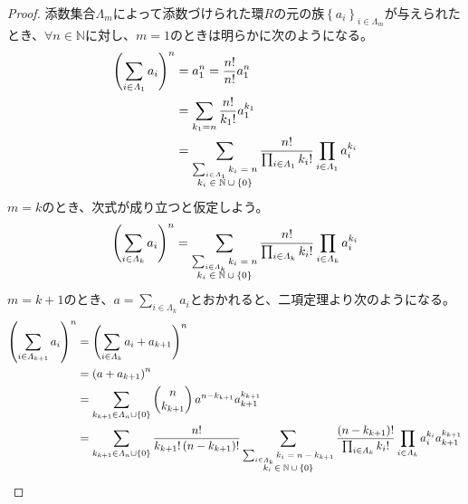 \documentclass[dvipdfmx]{jsarticle}
\begin{document}
\begin{proof}
添数集合$\varLambda_{m}$によって添数づけられた環$R$の元の族$\left\{ a_{i} \right\}_{i \in \varLambda_{m}}$が与えられたとき、$\forall n \in \mathbb{N}$に対し、$m = 1$のときは明らかに次のようになる。
\begin{align*}
\left( \sum_{i \in \varLambda_{1}} a_{i} \right)^{n} &= a_{1}^{n} = \frac{n!}{n!}a_{1}^{n}\\
&= \sum_{k_{1} = n } {\frac{n!}{k_{1}!}a_{1}^{k_{1}}}\\
&= \sum_{\scriptsize \begin{matrix} \sum_{i \in \varLambda_{1}} k_{i} = n \\k_{i} \in \mathbb{N} \cup \left\{ 0 \right\} \end{matrix}} {\frac{n!}{\prod_{i \in \varLambda_{1}} {k_{i}!}}\prod_{i \in \varLambda_{1}} a_{i}^{k_{i}}}
\end{align*}
$m = k$のとき、次式が成り立つと仮定しよう。
\begin{align*}
\left( \sum_{i \in \varLambda_{k}} a_{i} \right)^{n} = \sum_{\scriptsize \begin{matrix} \sum_{i \in \varLambda_{k}} k_{i} = n \\k_{i} \in \mathbb{N} \cup \left\{ 0 \right\} \end{matrix}} {\frac{n!}{\prod_{i \in \varLambda_{k}} {k_{i}!}}\prod_{i \in \varLambda_{k}} a_{i}^{k_{i}}}
\end{align*}
$m = k + 1$のとき、$a = \sum_{i \in \varLambda_{k}} a_{i}$とおかれると、二項定理より次のようになる。
\begin{align*}
\left( \sum_{i \in \varLambda_{k + 1}} a_{i} \right)^{n} &= \left( \sum_{i \in \varLambda_{k}} a_{i} + a_{k + 1} \right)^{n}\\
&= \left( a + a_{k + 1} \right)^{n}\\
&= \sum_{k_{k + 1} \in \varLambda_{n} \cup \left\{ 0 \right\}} {\begin{pmatrix}
n \\
k_{k + 1} \\
\end{pmatrix}a^{n - k_{k + 1}}a_{k + 1}^{k_{k + 1}}}\\
&= \sum_{k_{k + 1} \in \varLambda_{n} \cup \left\{ 0 \right\}} {\frac{n!}{k_{k + 1}!\left( n - k_{k + 1} \right)!}\sum_{\scriptsize \begin{matrix} \sum_{i \in \varLambda_{k}} k_{i} = n - k_{k + 1} \\k_{i} \in \mathbb{N} \cup \left\{ 0 \right\} \end{matrix}} {\frac{\left( n - k_{k + 1} \right)!}{\prod_{i \in \varLambda_{k}} {k_{i}!}}\prod_{i \in \varLambda_{k}} a_{i}^{k_{i}}}a_{k + 1}^{k_{k + 1}}}\\

\end{align*}
\end{proof}
\end{document}
